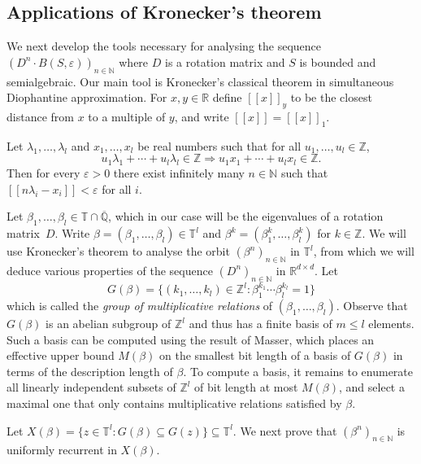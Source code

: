 \documentclass[a4paper,UKenglish,cleveref]{lipics-v2021}
\newcommand{\torus}{\mathbb{T}}
\newcommand{\nat}{\mathbb{N}}
\newcommand{\intg}{\mathbb{Z}}
\newcommand{\rel}{\mathbb{R}}
\newcommand{\rat}{\mathbb{Q}}
\newcommand{\alg}{\overline{\rat}}
\newcommand{\seq}[1]{(#1)_{n \in \mathbb{N}}}
\begin{document}
\subsection{Applications of Kronecker's theorem}
\label{sec:kronecker}

We next develop the tools necessary for analysing the sequence $(D^n \cdot B(S, \varepsilon))_{n\in\nat}$ where $D$ is a rotation matrix and $S$ is bounded and semialgebraic.
Our main tool is Kronecker's classical theorem in simultaneous Diophantine approximation.
For $x, y \in \rel$ define $[\![ x ]\!]_y$ to be the closest distance from $x$ to a multiple of $y$, and write $[\![ x ]\!] = [\![ x ]\!]_1$.

\begin{theorem}
	\label{thm:kronecker-classical}
	Let $\lambda_1,\ldots,\lambda_l$ and $x_1,\ldots,x_l$ be real numbers such that for all $u_1,\ldots,u_l \in \intg$,
	\[
	u_1 \lambda_1 + \cdots + u_l \lambda_l \in \intg \Rightarrow u_1x_1 + \cdots + u_lx_l \in \intg.
	\]
	Then for every $\varepsilon > 0$ there exist infinitely many $n \in \nat$ such that $[\![ n \lambda_i - x_i ]\!] < \varepsilon$ for all $i$.
\end{theorem}


Let $\beta_1,\ldots,\beta_l \in \torus \cap \alg$, which in our case will be the eigenvalues of a rotation matrix~$D$.
Write $\beta = (\beta_1,\ldots,\beta_l) \in \torus^l$ and $\beta^k = (\beta_1^k,\ldots,\beta_l^k)$ for $k \in \intg$.
We will use Kronecker's theorem to analyse the orbit $\seq{\beta^n}$ in $\torus^l$, from which we will deduce various properties of the sequence $(D^n)_{n\in\nat}$ in $\rel^{d\times d}$.
Let
\[
G(\beta) = \{(k_1,\ldots,k_l) \in \intg^l \colon \beta_1^{k_1}\cdots \beta_l^{k_l} = 1\}
\]
which is called the \emph{group of multiplicative relations} of $(\beta_1,\ldots,\beta_l)$.
Observe that $G(\beta)$ is an abelian subgroup of $\intg^l$ and thus has a finite basis of $m \le l$ elements.
Such a basis can be computed using the result \cite{masse-mult-rel-bound} of Masser, which places an effective upper bound $M(\beta)$ on the smallest bit length of a basis of $G(\beta)$ in terms of the description length of $\beta$.
To compute a basis, it remains to enumerate all linearly independent subsets of $\intg^l$ of bit length at most $M(\beta)$, and select a maximal one that only contains multiplicative relations satisfied by $\beta$.


Let $X(\beta) = \{z \in \torus^l \colon G(\beta) \subseteq G(z)\} \subseteq \torus^l$. 
We next prove that $(\beta^n)_{n\in\nat}$ is uniformly recurrent in $X(\beta)$.
\end{document}
